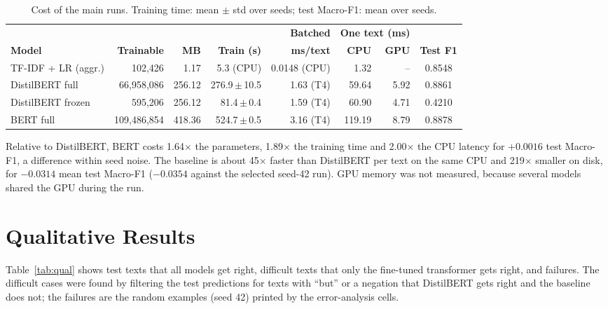 \documentclass[11pt,a4paper]{article}
\newcommand{\pmstd}[2]{#1\,$\pm$\,#2}
\begin{document}
\begin{table}[H]
\centering
\caption{Cost of the main runs. Training time: mean $\pm$ std over seeds; test Macro-F1: mean over seeds.}
\label{tab:cost}
\small\setlength{\tabcolsep}{4pt}
\begin{tabular}{@{}lrrrrrrc@{}}
\toprule
& & & & \textbf{Batched} & \multicolumn{2}{c}{\textbf{One text (ms)}} & \\
\cmidrule(lr){6-7}
\textbf{Model} & \textbf{Trainable} & \textbf{MB} & \textbf{Train (s)} & \textbf{ms/text} & \textbf{CPU} & \textbf{GPU} & \textbf{Test F1}\\
\midrule
TF-IDF + LR (aggr.) & 102,426 & 1.17 & 5.3 (CPU) & 0.0148 (CPU) & 1.32 & -- & 0.8548\\
DistilBERT full & 66,958,086 & 256.12 & \pmstd{276.9}{10.5} & 1.63 (T4) & 59.64 & 5.92 & 0.8861\\
DistilBERT frozen & 595,206 & 256.12 & \pmstd{81.4}{0.4} & 1.59 (T4) & 60.90 & 4.71 & 0.4210\\
BERT full & 109,486,854 & 418.36 & \pmstd{524.7}{0.5} & 3.16 (T4) & 119.19 & 8.79 & 0.8878\\
\bottomrule
\end{tabular}
\end{table}

Relative to DistilBERT, BERT costs 1.64$\times$ the parameters, 1.89$\times$ the training time and 2.00$\times$ the CPU latency for $+0.0016$ test Macro-F1, a difference within seed noise. The baseline is about 45$\times$ faster than DistilBERT per text on the same CPU and 219$\times$ smaller on disk, for $-0.0314$ mean test Macro-F1 ($-0.0354$ against the selected seed-42 run). GPU memory was not measured, because several models shared the GPU during the run.

\section{Qualitative Results}
Table~\ref{tab:qual} shows test texts that all models get right, difficult texts that only the fine-tuned transformer gets right, and failures. The difficult cases were found by filtering the test predictions for texts with ``but'' or a negation that DistilBERT gets right and the baseline does not; the failures are the random examples (seed 42) printed by the error-analysis cells.
\end{document}
